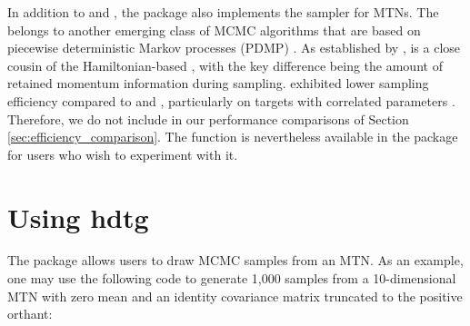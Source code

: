\tbCompare

In addition to \hhmc and \zhmc, the  package also implements the \mzz sampler \citep{bierkens2019ergodicity} for MTNs. The \mzz belongs to another emerging class of MCMC algorithms that are based on piecewise deterministic Markov processes (PDMP) \citep{fearnhead2018piecewise}. As established by \cite{nishimura2024zigzag}, \mzz is a close cousin of the Hamiltonian-based \zhmc, with the key difference being the amount of retained momentum information during sampling. \mzz exhibited lower sampling efficiency compared to \hhmc and \zhmc, particularly on targets with correlated parameters \citep{nishimura2024zigzag}. Therefore, we do not include \mzz in our performance comparisons of Section \ref{sec:efficiency_comparison}. The \mzz function is nevertheless available in the package for users who wish to experiment with it.

\section{Using hdtg}\label{sec:pkg}
The  package allows users to draw MCMC samples from an MTN.
As an example, one may use the following code to generate 1,000 samples from a 10-dimensional MTN with zero mean and an identity covariance matrix truncated to the positive orthant:


